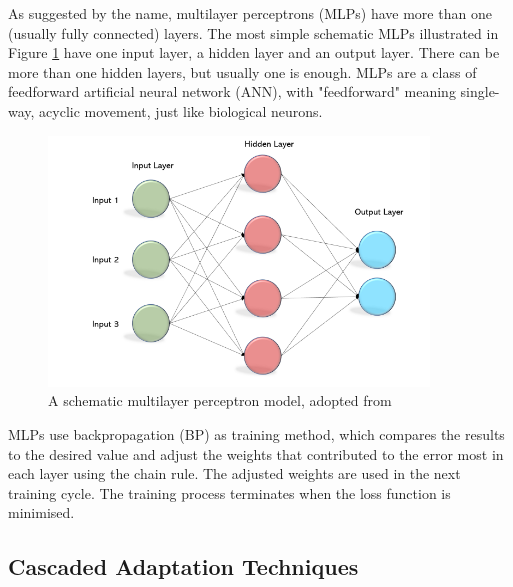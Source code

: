 \documentclass[nobib]{tufte-handout}
\begin{document}
\noindent As suggested by the name, multilayer perceptrons (MLPs) have more than one (usually fully connected) layers. The most simple schematic MLPs illustrated in Figure \ref{fig:mlp} have one input layer, a hidden layer and an output layer. There can be more than one hidden layers, but usually one is enough. MLPs are a class of feedforward artificial neural network (ANN), with "feedforward" meaning single-way, acyclic movement, just like biological neurons.\\ 
\begin{figure}
  \includegraphics[width=0.9\textwidth]{mlp3.png}
  \caption{A schematic multilayer perceptron model, adopted from \cite{becominghuman:MLP}}
  \label{fig:mlp}
\end{figure}
\noindent MLPs use backpropagation (BP) as training method, which compares the results to the desired value and adjust the weights that contributed to the error most in each layer using the chain rule. The adjusted weights are used in the next training cycle. The training process terminates when the loss function is minimised.


\subsection{Cascaded Adaptation Techniques}
\end{document}
